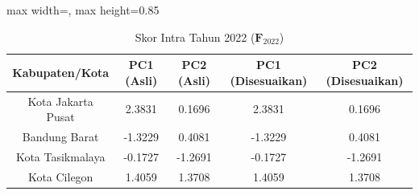 \begin{table}[H]
\centering
\caption{Skor Intra Tahun 2022 ($\mathbf{F}_{2022}$)} \makeatletter{}\makeatother
\begin{adjustbox}{max width=\textwidth, max height=0.85\textheight}
\begin{tabular}{|c|c|c|c|c|}
\hline
\textbf{Kabupaten/Kota} & \textbf{PC1 (Asli)} & \textbf{PC2 (Asli)} & \textbf{PC1 (Disesuaikan)} & \textbf{PC2 (Disesuaikan)} \\
\hline
Kota Jakarta Pusat & 2.3831 & 0.1696 & 2.3831 & 0.1696 \\
Bandung Barat & -1.3229 & 0.4081 & -1.3229 & 0.4081 \\
Kota Tasikmalaya & -0.1727 & -1.2691 & -0.1727 & -1.2691 \\
Kota Cilegon & 1.4059 & 1.3708 & 1.4059 & 1.3708 \\
\hline
\end{tabular}
\end{adjustbox}
\end{table}
